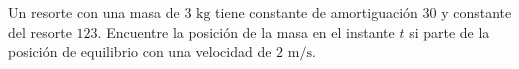 \item Un resorte con una masa de $3 \text{ kg}$ tiene constante de amortiguación $30$ y constante del resorte $123$. Encuentre la posición de la masa en el instante $t$ si parte de la posición de equilibrio con una velocidad de $2 \text{ m/s}$.
